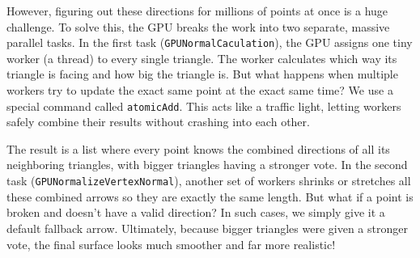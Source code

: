 However, figuring out these directions for millions of points at once is a huge challenge. To solve this, the GPU breaks the work into two separate, massive parallel tasks. In the first task (\texttt{GPUNormalCaculation}), the GPU assigns one tiny worker (a thread) to every single triangle. The worker calculates which way its triangle is facing and how big the triangle is. But what happens when multiple workers try to update the exact same point at the exact same time? We use a special command called \texttt{atomicAdd}. This acts like a traffic light, letting workers safely combine their results without crashing into each other.

The result is a list where every point knows the combined directions of all its neighboring triangles, with bigger triangles having a stronger vote. In the second task (\texttt{GPUNormalizeVertexNormal}), another set of workers shrinks or stretches all these combined arrows so they are exactly the same length. But what if a point is broken and doesn't have a valid direction? In such cases, we simply give it a default fallback arrow. Ultimately, because bigger triangles were given a stronger vote, the final surface looks much smoother and far more realistic!


